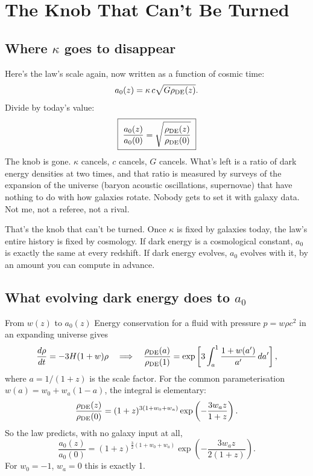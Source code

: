 \chapter{The Knob That Can't Be Turned}




\section{Where \texorpdfstring{$\kappa$}{kappa} goes to disappear}

Here's the law's scale again, now written as a function of cosmic time:
\begin{equation}
a_0(z)=\kappa\,c\sqrt{G\rho_{\rm DE}(z)}.
\end{equation}
Divide by today's value:
\begin{equation}
\boxed{\;\frac{a_0(z)}{a_0(0)}=\sqrt{\frac{\rho_{\rm DE}(z)}{\rho_{\rm DE}(0)}}\;}
\end{equation}
The knob is gone. $\kappa$ cancels, $c$ cancels, $G$ cancels. What's left is a ratio of dark energy densities at two times, and that ratio is measured by surveys of the expansion of the universe (baryon acoustic oscillations, supernovae) that have nothing to do with how galaxies rotate. Nobody gets to set it with galaxy data. Not me, not a referee, not a rival.

That's the knob that can't be turned. Once $\kappa$ is fixed by galaxies today, the law's entire history is fixed by cosmology. If dark energy is a cosmological constant, $a_0$ is exactly the same at every redshift. If dark energy evolves, $a_0$ evolves with it, by an amount you can compute in advance.

\section{What evolving dark energy does to \texorpdfstring{$a_0$}{a0}}

\begin{mathbox}{From $w(z)$ to $a_0(z)$}
Energy conservation for a fluid with pressure $p=w\rho c^2$ in an expanding universe gives
\[
\frac{d\rho}{dt}=-3H(1+w)\rho\quad\Longrightarrow\quad\frac{\rho_{\rm DE}(a)}{\rho_{\rm DE}(1)}=\exp\left[3\int_a^1\frac{1+w(a')}{a'}\,da'\right],
\]
where $a=1/(1+z)$ is the scale factor. For the common parameterisation $w(a)=w_0+w_a(1-a)$, the integral is elementary:
\[
\frac{\rho_{\rm DE}(z)}{\rho_{\rm DE}(0)}=(1+z)^{3(1+w_0+w_a)}\exp\left(-\frac{3w_az}{1+z}\right).
\]
So the law predicts, with no galaxy input at all,
\[
\frac{a_0(z)}{a_0(0)}=(1+z)^{\frac32(1+w_0+w_a)}\exp\left(-\frac{3w_az}{2(1+z)}\right).
\]
For $w_0=-1$, $w_a=0$ this is exactly 1.
\end{mathbox}

